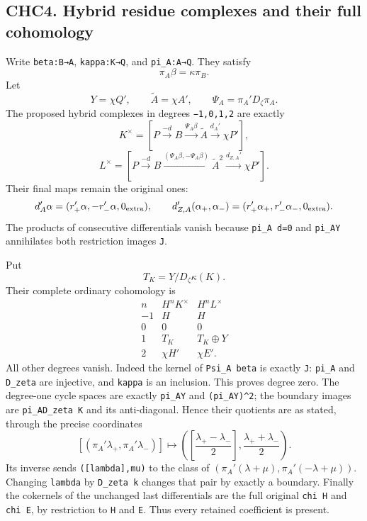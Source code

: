 \subsection{CHC4. Hybrid residue complexes and their full
cohomology}\label{chc4.-hybrid-residue-complexes-and-their-full-cohomology}

Write \texttt{beta:B→A}, \texttt{kappa:K→Q}, and \texttt{pi\_A:A→Q}.
They satisfy \[
\pi_A\beta=\kappa\pi_B.
\] Let \[
Y=\chi Q',\qquad \widetilde A=\chi A',\qquad
\Psi_A=\pi_A'D_\zeta\pi_A.
\] The proposed hybrid complexes in degrees \texttt{−1,0,1,2} are
exactly \[
K^\times=[P\xrightarrow{-d}B
\xrightarrow{\Psi_A\beta}\widetilde A
\xrightarrow{d_A'}\chi P'],
\tag{CHC4.1}
\] \[
L^\times=[P\xrightarrow{-d}B
\xrightarrow{(\Psi_A\beta,-\Psi_A\beta)}\widetilde A^2
\xrightarrow{d_{Z,A}'}\chi P'].
\tag{CHC4.2}
\] Their final maps remain the original ones: \[
d_A'\alpha=(r_+'\alpha,-r_-'\alpha,0_{\rm extra}),
\qquad
d_{Z,A}'(\alpha_+,\alpha_-)
=(r_+'\alpha_+,r_-'\alpha_-,0_{\rm extra}).
\] The products of consecutive differentials vanish because
\texttt{pi\_A\ d=0} and \texttt{pi\_A\textquotesingle{}Y} annihilates
both restriction images \texttt{J}.

Put \[
T_K=Y/D_\zeta\kappa(K).
\tag{CHC4.3}
\] Their complete ordinary cohomology is \[
\begin{array}{c|cc}
n&H^nK^\times&H^nL^\times\\\hline
-1&H&H\\
0&0&0\\
1&T_K&T_K\oplus Y\\
2&\chi H'&\chi E'.
\end{array}
\tag{CHC4.4}
\] All other degrees vanish. Indeed the kernel of \texttt{Psi\_A\ beta}
is exactly \texttt{J}: \texttt{pi\_A\textquotesingle{}} and
\texttt{D\_zeta} are injective, and \texttt{kappa} is an inclusion. This
proves degree zero. The degree-one cycle spaces are exactly
\texttt{pi\_A\textquotesingle{}Y} and
\texttt{(pi\_A\textquotesingle{}Y)\^{}2}; the boundary images are
\texttt{pi\_A\textquotesingle{}D\_zeta\ K} and its anti-diagonal. Hence
their quotients are as stated, through the precise coordinates \[
[(\pi_A'\lambda_+,\pi_A'\lambda_-)]
\longmapsto
\left(\left[\frac{\lambda_+-\lambda_-}{2}\right],
\frac{\lambda_++\lambda_-}{2}\right).
\tag{CHC4.5}
\] Its inverse sends \texttt{({[}lambda{]},mu)} to the class of
\((\pi_A'(\lambda+\mu),\pi_A'(-\lambda+\mu))\). Changing \texttt{lambda}
by \texttt{D\_zeta\ k} changes that pair by exactly a boundary. Finally
the cokernels of the unchanged last differentials are the full original
\texttt{chi\ H\textquotesingle{}} and \texttt{chi\ E\textquotesingle{}},
by restriction to \texttt{H} and \texttt{E}. Thus every retained
coefficient is present.

